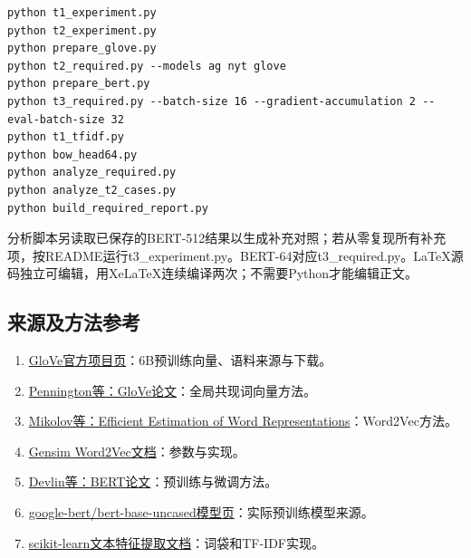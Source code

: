 \documentclass[UTF8,a4paper,11pt,fontset=fandol]{ctexart}
\begin{document}
\par\noindent\begin{minipage}{\linewidth}
\begin{Verbatim}[breaklines=true,breakanywhere=true,fontsize=\small,frame=single,framesep=3mm]
python t1_experiment.py
python t2_experiment.py
python prepare_glove.py
python t2_required.py --models ag nyt glove
python prepare_bert.py
python t3_required.py --batch-size 16 --gradient-accumulation 2 --eval-batch-size 32
python t1_tfidf.py
python bow_head64.py
python analyze_required.py
python analyze_t2_cases.py
python build_required_report.py
\end{Verbatim}
\end{minipage}\par
分析脚本另读取已保存的BERT-512结果以生成补充对照；若从零复现所有补充项，按README运行t3\_\allowbreak{}experiment.\allowbreak{}py。BERT-64对应t3\_\allowbreak{}required.\allowbreak{}py。LaTeX源码独立可编辑，用XeLaTeX连续编译两次；不需要Python才能编辑正文。

\subsection{来源及方法参考}
\begin{enumerate}
\item 
\href{https://nlp.stanford.edu/projects/glove/}{GloVe官方项目页}：6B预训练向量、语料来源与下载。

\item 
\href{https://nlp.stanford.edu/pubs/glove.pdf}{Pennington等：GloVe论文}：全局共现词向量方法。

\item 
\href{https://arxiv.org/abs/1301.3781}{Mikolov等：Efficient Estimation of Word Representations}：Word2Vec方法。

\item 
\href{https://radimrehurek.com/gensim/models/word2vec.html}{Gensim Word2Vec文档}：参数与实现。

\item 
\href{https://arxiv.org/abs/1810.04805}{Devlin等：BERT论文}：预训练与微调方法。

\item 
\href{https://huggingface.co/google-bert/bert-base-uncased}{google-bert/\allowbreak{}bert-base-uncased模型页}：实际预训练模型来源。

\item 
\href{https://scikit-learn.org/stable/modules/feature_extraction.html#text-feature-extraction}{scikit-learn文本特征提取文档}：词袋和TF-IDF实现。

\end{enumerate}
\end{document}
